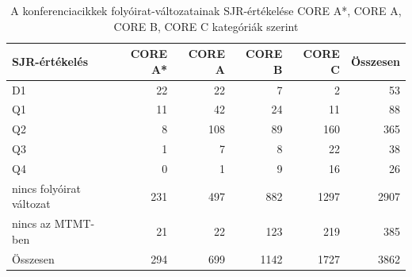 \begin{table}[h]
  \centering
  \begin{tabular}{lrrrr|r}
    \toprule
    SJR-értékelés & CORE A* & CORE A & CORE B & CORE C & Összesen \\
    \midrule
    D1 & 22 & 22 & 7 & 2 & 53 \\
    Q1 & 11 & 42 & 24 & 11 & 88 \\
    Q2 & 8 & 108 & 89 & 160 & 365 \\
    Q3 & 1 & 7 & 8 & 22 & 38 \\
    Q4 & 0 & 1 & 9 & 16 & 26 \\
    nincs folyóirat változat & 231 & 497 & 882 & 1297 & 2907 \\
    nincs az MTMT-ben & 21 & 22 & 123 & 219 & 385 \\
    \midrule
    Összesen & 294 & 699 & 1142 & 1727 & 3862 \\
    \bottomrule
  \end{tabular}
  \caption{A konferenciacikkek folyóirat-változatainak SJR-értékelése CORE A*, CORE A, CORE B, CORE C kategóriák szerint}
  \label{tab:sjr_rating_summary}
\end{table}